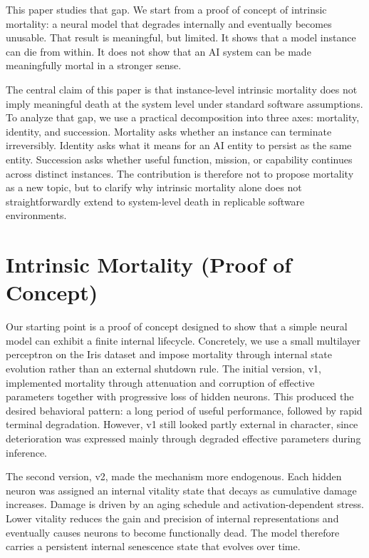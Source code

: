 \documentclass[11pt]{article}
\begin{document}
This paper studies that gap. We start from a proof of concept of intrinsic mortality: a neural model that degrades internally and eventually becomes unusable. That result is meaningful, but limited. It shows that a model instance can die from within. It does not show that an AI system can be made meaningfully mortal in a stronger sense.

The central claim of this paper is that instance-level intrinsic mortality does not imply meaningful death at the system level under standard software assumptions. To analyze that gap, we use a practical decomposition into three axes: mortality, identity, and succession. Mortality asks whether an instance can terminate irreversibly. Identity asks what it means for an AI entity to persist as the same entity. Succession asks whether useful function, mission, or capability continues across distinct instances. The contribution is therefore not to propose mortality as a new topic, but to clarify why intrinsic mortality alone does not straightforwardly extend to system-level death in replicable software environments.

\newpage
\section{Intrinsic Mortality (Proof of Concept)}

Our starting point is a proof of concept designed to show that a simple neural model can exhibit a finite internal lifecycle. Concretely, we use a small multilayer perceptron on the Iris dataset and impose mortality through internal state evolution rather than an external shutdown rule. The initial version, v1, implemented mortality through attenuation and corruption of effective parameters together with progressive loss of hidden neurons. This produced the desired behavioral pattern: a long period of useful performance, followed by rapid terminal degradation. However, v1 still looked partly external in character, since deterioration was expressed mainly through degraded effective parameters during inference.

The second version, v2, made the mechanism more endogenous. Each hidden neuron was assigned an internal vitality state that decays as cumulative damage increases. Damage is driven by an aging schedule and activation-dependent stress. Lower vitality reduces the gain and precision of internal representations and eventually causes neurons to become functionally dead. The model therefore carries a persistent internal senescence state that evolves over time.
\end{document}
